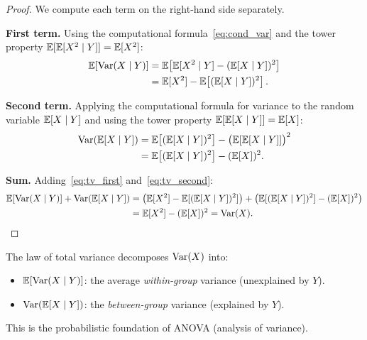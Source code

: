 \documentclass[11pt,a4paper]{article}
\begin{document}
\begin{proof}
We compute each term on the right-hand side separately.

\textbf{First term.} Using the computational
formula~\eqref{eq:cond_var} and the tower property
$\mathbb{E}[\mathbb{E}[X^2 \mid Y]] = \mathbb{E}[X^2]$:
\begin{align}
  \mathbb{E}[\operatorname{Var}(X \mid Y)]
  &= \mathbb{E}\!\left[\mathbb{E}[X^2 \mid Y] - (\mathbb{E}[X \mid Y])^2\right]
  \nonumber\\
  &= \mathbb{E}[X^2] - \mathbb{E}\!\left[(\mathbb{E}[X \mid Y])^2\right].
  \label{eq:tv_first}
\end{align}

\textbf{Second term.} Applying the computational formula for
variance to the random variable $\mathbb{E}[X \mid Y]$ and using the
tower property $\mathbb{E}[\mathbb{E}[X \mid Y]] = \mathbb{E}[X]$:
\begin{align}
  \operatorname{Var}(\mathbb{E}[X \mid Y])
  &= \mathbb{E}\!\left[(\mathbb{E}[X \mid Y])^2\right]
    - \bigl(\mathbb{E}[\mathbb{E}[X \mid Y]]\bigr)^2
  \nonumber\\
  &= \mathbb{E}\!\left[(\mathbb{E}[X \mid Y])^2\right] - (\mathbb{E}[X])^2.
  \label{eq:tv_second}
\end{align}

\textbf{Sum.} Adding~\eqref{eq:tv_first}
and~\eqref{eq:tv_second}:
\begin{align}
  \mathbb{E}[\operatorname{Var}(X \mid Y)] + \operatorname{Var}(\mathbb{E}[X \mid Y])
  &= \bigl(\mathbb{E}[X^2] - \mathbb{E}[(\mathbb{E}[X \mid Y])^2]\bigr)
    + \bigl(\mathbb{E}[(\mathbb{E}[X \mid Y])^2] - (\mathbb{E}[X])^2\bigr)
  \nonumber\\
  &= \mathbb{E}[X^2] - (\mathbb{E}[X])^2 = \operatorname{Var}(X). \qedhere
  \label{eq:tv_sum}
\end{align}
\end{proof}

\begin{remark}[Interpretation]
The law of total variance decomposes $\operatorname{Var}(X)$ into:
\begin{itemize}[nosep]
  \item $\mathbb{E}[\operatorname{Var}(X \mid Y)]$: the average \emph{within-group}
    variance (unexplained by $Y$).
  \item $\operatorname{Var}(\mathbb{E}[X \mid Y])$: the \emph{between-group} variance
    (explained by $Y$).
\end{itemize}
This is the probabilistic foundation of ANOVA (analysis of
variance).
\end{remark}
\end{document}

